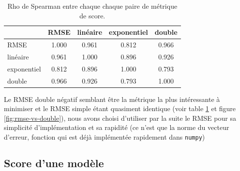 \documentclass[letterpaper]{article}
\begin{document}
\begin{table}[h]
\begin{tabular}{|l|c|c|c|c|}
  \hline
  & RMSE & linéaire & exponentiel & double \\
  \hline
RMSE & 1.000 & 0.961 & 0.812 & 0.966 \\
linéaire & 0.961 & 1.000 & 0.896 & 0.926 \\
exponentiel & 0.812 & 0.896 & 1.000 & 0.793 \\
double & 0.966 & 0.926 & 0.793 & 1.000 \\
  \hline
\end{tabular}
  \caption{\label{tab:rho} Rho de Spearman entre chaque chaque paire de métrique de score.}
\end{table}

Le RMSE double négatif semblant être la métrique la plus intéressante à minimiser et le RMSE simple étant quasiment identique (voir table \ref{tab:rho} et figure \ref{fig:rmse-vs-double}), nous avons choisi d'utiliser par la suite le RMSE pour sa simplicité d'implémentation et sa rapidité (ce n'est que la norme du vecteur d'erreur, fonction qui est déjà implémentée rapidement dans \texttt{numpy})

\FloatBarrier
\subsection{Score d'une modèle}





\end{document}
